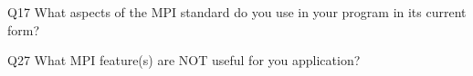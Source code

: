 \begin{description}%
\item{Q17} What aspects of the MPI standard do you use in your program in its current form?%
\item{Q27} What MPI feature(s) are NOT useful for you application?%
\end{description}%
